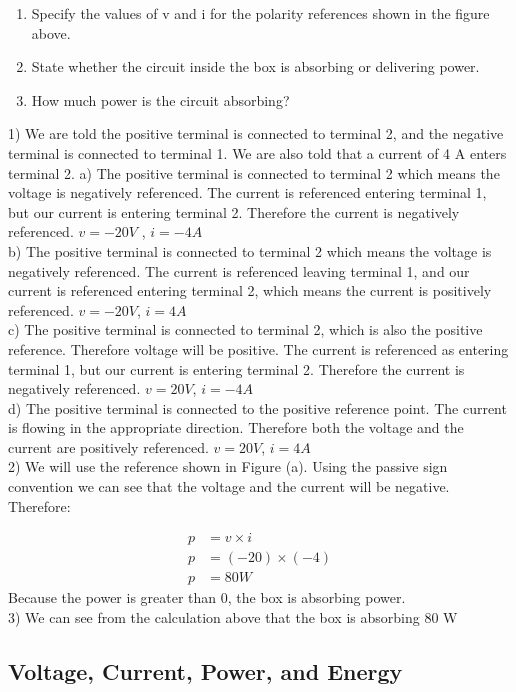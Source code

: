 \begin{enumerate}
	\item Specify the values of v and i for the polarity references shown in the figure above.
	\item State whether the circuit inside the box is absorbing or delivering power.
	\item How much power is the circuit absorbing? 
\end{enumerate}

1) We are told the positive terminal is connected to terminal 2, and the negative terminal is
connected to terminal 1. We are also told that a current of 4 A enters terminal 2. 
a) The positive terminal is connected to terminal 2 which means the voltage is negatively referenced.
The current is referenced entering terminal 1, but our current is entering terminal 2. Therefore the current is negatively referenced. \(v = -20V \) , \(i = -4A\)
\\b) The positive terminal is connected to terminal 2  which means the voltage is negatively
referenced. The current is referenced leaving terminal 1, and our current is referenced entering
terminal 2, which means the current is positively referenced. \(v = -20V \), \(i = 4A\)
\\c) The positive terminal is connected to terminal 2, which is also the positive reference. 
Therefore voltage will be positive. The current is referenced as entering terminal 1, but our current is entering terminal 2. Therefore the current is negatively referenced. \(v = 20V\), \(i = -4A\)
\\d) The positive terminal is connected to the positive reference point. The current is flowing
in the appropriate direction. Therefore both the voltage and the current are positively referenced.
\(v = 20V\), \(i=4A\)
\\2) We will use the reference shown in Figure (a). Using the passive sign convention we can see that
the voltage and the current will be negative. Therefore:

\begin{align*}
	p &= v \times i
	\\ p &= (-20) \times (-4)
	\\ p &= 80W
\end{align*}
Because the power is greater than 0, the box is absorbing power. 
\\3) We can see from the calculation above that the box is absorbing 80 W

\newpage
\subsection{Voltage, Current, Power, and Energy}

